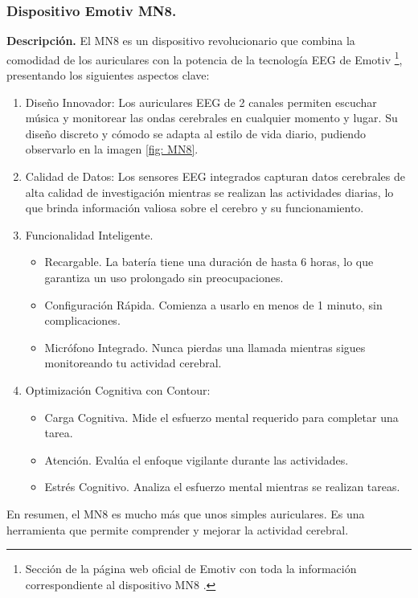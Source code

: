 \subsubsection{Dispositivo Emotiv MN8.}
\textbf{Descripción.}
El MN8 es un dispositivo revolucionario que combina la comodidad de los auriculares con la potencia de la tecnología EEG de Emotiv \cite{EmotivMN8}\footnote{Sección de la página web oficial de Emotiv con toda la información correspondiente al dispositivo MN8 \cite{EmotivMN8}.}, presentando los siguientes aspectos clave:
\begin{enumerate}
    \item Diseño Innovador: Los auriculares EEG de 2 canales permiten escuchar música y monitorear las ondas cerebrales en cualquier momento y lugar. Su diseño discreto y cómodo se adapta al estilo de vida diario, pudiendo observarlo en la imagen \ref{fig: MN8}.
    \item Calidad de Datos: Los sensores EEG integrados capturan datos cerebrales de alta calidad de investigación mientras se realizan las actividades diarias, lo que brinda información valiosa sobre el cerebro y su funcionamiento.
    \item Funcionalidad Inteligente.
    \begin{itemize}
        \item Recargable. La batería tiene una duración de hasta 6 horas, lo que garantiza un uso prolongado sin preocupaciones.
        \item Configuración Rápida. Comienza a usarlo en menos de 1 minuto, sin complicaciones.
        \item Micrófono Integrado. Nunca pierdas una llamada mientras sigues monitoreando tu actividad cerebral.
    \end{itemize}
    \item Optimización Cognitiva con Contour:
    \begin{itemize}
        \item Carga Cognitiva. Mide el esfuerzo mental requerido para completar una tarea.
        \item Atención. Evalúa el enfoque vigilante durante las actividades.
        \item Estrés Cognitivo. Analiza el esfuerzo mental mientras se realizan tareas.
    \end{itemize}
\end{enumerate}

En resumen, el MN8 es mucho más que unos simples auriculares. Es una herramienta que permite comprender y mejorar la actividad cerebral.

